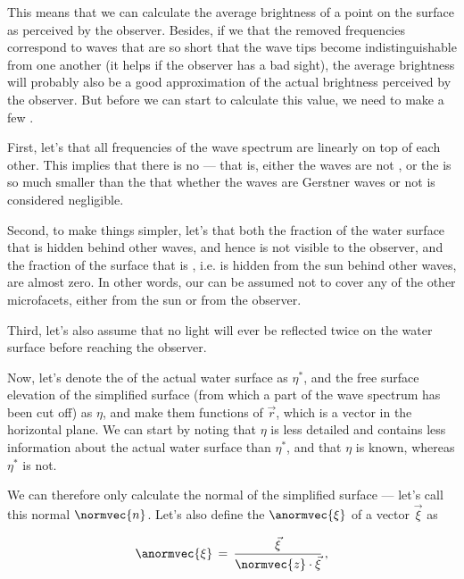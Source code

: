 This means that we can calculate the average brightness of a point on the surface as perceived by the observer. Besides, if we \assume that the removed frequencies correspond to waves that are so short that the wave tips become indistinguishable from one another (it helps if the observer has a bad sight), the average brightness will probably also be a good approximation of the actual brightness perceived by the observer. But before we can start to calculate this value, we need to make a few \assumptions.

First, let's \assume that all frequencies of the wave spectrum are \superposed linearly on top of each other. This implies that there is no  --- that is, either the waves are not , or the  is so much smaller than the \wavelength that whether the waves are Gerstner waves or not is considered negligible.

Second, to make things simpler, let's \assume that both the fraction of the water surface that is hidden behind other waves, and hence is not visible to the observer, and the fraction of the surface that is \shadowed, i.e. is hidden from the sun behind other waves, are almost zero. In other words, our \microfacets can be assumed not to cover any of the other microfacets, either from the sun or from the observer.

Third, let's also assume that no light will ever be reflected twice on the water surface before reaching the observer.

Now, let's denote the  of the actual water surface as $\eta^*$, and the free surface elevation of the simplified surface (from which a part of the wave spectrum has been cut off) as $\eta$, and make them functions of $\vec{r}$, which is a \twodimensional vector in the horizontal plane. We can start by noting that $\eta$ is less detailed and contains less information about the actual water surface than $\eta^*$, and that $\eta$ is known, whereas $\eta^*$ is not.

We can therefore only calculate the normal of the simplified surface --- let's call this normal $\normvec{n}$. Let's also define the  $\anormvec{\xi}$ of a vector $\vec{\xi}$ as

\begin{equation} \label{eq:anti_normal_definition}
\anormvec{\xi} \,=\, \frac{\vec{\xi}}{\normvec{z}\cdot\vec{\xi}}\,,
\end{equation}

